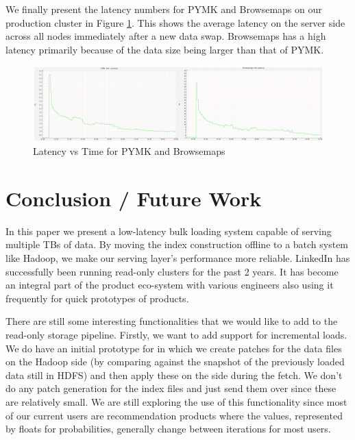 \documentclass[10pt,twocolumn,preprint,natbib,authoryear]{sigplanconf}
\begin{document}
We finally present the latency numbers for PYMK and Browsemaps on our production cluster in Figure \ref{production}. This shows the average latency on the server side across all nodes immediately after a new data swap. Browsemaps has a high latency primarily because of the data size being larger than that of PYMK.

\begin{figure}
  \centering
    \includegraphics[scale=0.23]{images/get_latency.png}
  \caption{Latency vs Time for PYMK and Browsemaps}
  \label{production}
\end{figure}





\section{Conclusion / Future Work}
\label{sec:conclusion}

In this paper we present a low-latency bulk loading system capable of serving multiple TBs of data. By moving the index construction offline to a batch system like Hadoop, we make our serving layer's performance more reliable. LinkedIn has successfully been running read-only \projectname{} clusters for the past 2 years. It has become an integral part of the product eco-system with various engineers also using it frequently for quick prototypes of products. 

There are still some interesting functionalities that we would like to add to the read-only storage pipeline. Firstly, we want to add support for incremental loads. We do have an initial prototype for in which we create patches for the data files on the Hadoop side (by comparing against the snapshot of the previously loaded data still in HDFS) and then apply these on the \projectname{} side during the fetch. We don't do any patch generation for the index files and just send them over since these are relatively small. We are still exploring the use of this functionality since most of our current users are recommendation products where the values, represented by floats for probabilities, generally change between iterations for most users. 
\end{document}
